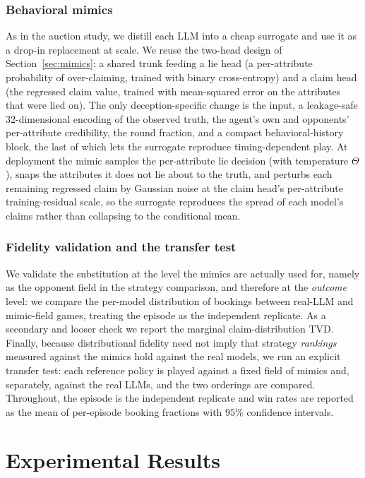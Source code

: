 \documentclass[conference]{IEEEtran}
\begin{document}
\subsubsection{Behavioral mimics}
\label{sec:dec5-mimics}
As in the auction study, we distill each LLM into a cheap surrogate and use it as a drop-in replacement at scale. We reuse the two-head design of Section~\ref{sec:mimics}: a shared trunk feeding a lie head (a per-attribute probability of over-claiming, trained with binary cross-entropy) and a claim head (the regressed claim value, trained with mean-squared error on the attributes that were lied on). The only deception-specific change is the input, a leakage-safe $32$-dimensional encoding of the observed truth, the agent's own and opponents' per-attribute credibility, the round fraction, and a compact behavioral-history block, the last of which lets the surrogate reproduce timing-dependent play. At deployment the mimic samples the per-attribute lie decision (with temperature $\Theta$), snaps the attributes it does not lie about to the truth, and perturbs each remaining regressed claim by Gaussian noise at the claim head's per-attribute training-residual scale, so the surrogate reproduces the spread of each model's claims rather than collapsing to the conditional mean.

\subsubsection{Fidelity validation and the transfer test}
\label{sec:dec5-fidelity-method}
We validate the substitution at the level the mimics are actually used for, namely as the opponent field in the strategy comparison, and therefore at the \emph{outcome} level: we compare the per-model distribution of bookings between real-LLM and mimic-field games, treating the episode as the independent replicate. As a secondary and looser check we report the marginal claim-distribution TVD. Finally, because distributional fidelity need not imply that strategy \emph{rankings} measured against the mimics hold against the real models, we run an explicit transfer test: each reference policy is played against a fixed field of mimics and, separately, against the real LLMs, and the two orderings are compared. Throughout, the episode is the independent replicate and win rates are reported as the mean of per-episode booking fractions with $95\%$ confidence intervals.


\noindent

\section{Experimental Results}
\end{document}
